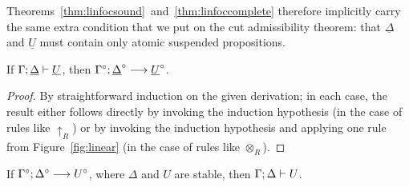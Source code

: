Theorems~\ref{thm:linfocsound}~and~\ref{thm:linfoccomplete} therefore
implicitly carry the same extra condition that we put on the cut
admissibility theorem: that $\underline{\Delta}$ and $\underline{U}$
must contain only atomic suspended propositions.

\bigskip
\begin{theorem}\label{thm:linfocsound}
If ${\Gamma};{\underline{\Delta}} \vdash {\underline{U}} \mathstrut$, 
then ${\Gamma^\circ};{\underline{\Delta}^\circ} \longrightarrow {\underline{U}^\circ} \mathstrut$.
\end{theorem}

\begin{proof}
  By straightforward induction on the given derivation; in each case,
  the result either follows directly by invoking the induction
  hypothesis (in the case of rules like ${\uparrow}_R$) or by invoking
  the induction hypothesis and applying one rule from
  Figure~\ref{fig:linear} (in the case of rules like ${\otimes}_R$).
\end{proof}

\begin{theorem}\label{thm:linfoccomplete}
If ${\Gamma^\circ};{\Delta^\circ} \longrightarrow {U^\circ} \mathstrut$, where $\Delta$ and $U$ are
stable,
then ${\Gamma};{\Delta} \vdash {U} \mathstrut$. 
\end{theorem}

